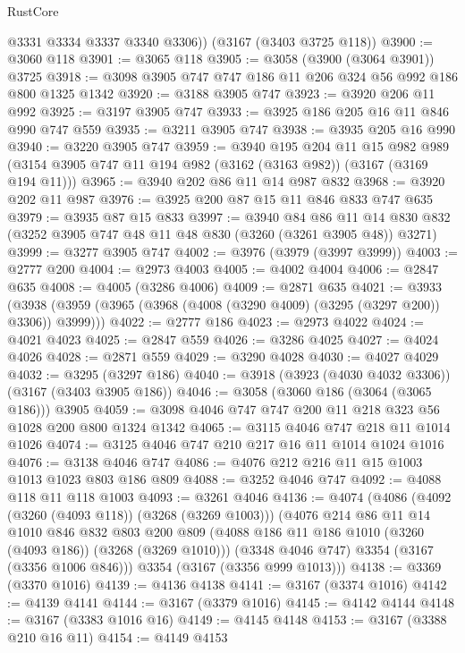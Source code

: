 \begin{lexlean}{RustCore}
\begin{coremodule}
        @3331
        @3334
        @3337
        @3340
        @3306))
    (@3167 (@3403 @3725 @118))
@3900 := @3060 @118
@3901 := @3065 @118
@3905 := @3058 (@3900 (@3064 @3901)) @3725
@3918 := @3098 @3905 @747 @747 @186 @11 @206 @324 @56 @992 @186 @800 @1325 @1342
@3920 := @3188 @3905 @747
@3923 := @3920 @206 @11 @992
@3925 := @3197 @3905 @747
@3933 := @3925 @186 @205 @16 @11 @846 @990 @747 @559
@3935 := @3211 @3905 @747
@3938 := @3935 @205 @16 @990
@3940 := @3220 @3905 @747
@3959 := @3940
    @195
    @204
    @11
    @15
    @982
    @989
    (@3154 @3905 @747 @11 @194 @982 (@3162 (@3163 @982)) (@3167 (@3169 @194 @11)))
@3965 := @3940 @202 @86 @11 @14 @987 @832
@3968 := @3920 @202 @11 @987
@3976 := @3925 @200 @87 @15 @11 @846 @833 @747 @635
@3979 := @3935 @87 @15 @833
@3997 := @3940
    @84
    @86
    @11
    @14
    @830
    @832
    (@3252 @3905 @747 @48 @11 @48 @830 (@3260 (@3261 @3905 @48)) @3271)
@3999 := @3277 @3905 @747
@4002 := @3976 (@3979 (@3997 @3999))
@4003 := @2777 @200
@4004 := @2973 @4003
@4005 := @4002 @4004
@4006 := @2847 @635
@4008 := @4005 (@3286 @4006)
@4009 := @2871 @635
@4021 := @3933
    (@3938 (@3959 (@3965 (@3968 (@4008 (@3290 @4009) (@3295 (@3297 @200)) @3306)) @3999)))
@4022 := @2777 @186
@4023 := @2973 @4022
@4024 := @4021 @4023
@4025 := @2847 @559
@4026 := @3286 @4025
@4027 := @4024 @4026
@4028 := @2871 @559
@4029 := @3290 @4028
@4030 := @4027 @4029
@4032 := @3295 (@3297 @186)
@4040 := @3918 (@3923 (@4030 @4032 @3306)) (@3167 (@3403 @3905 @186))
@4046 := @3058 (@3060 @186 (@3064 (@3065 @186))) @3905
@4059 := @3098 @4046 @747 @747 @200 @11 @218 @323 @56 @1028 @200 @800 @1324 @1342
@4065 := @3115 @4046 @747 @218 @11 @1014 @1026
@4074 := @3125 @4046 @747 @210 @217 @16 @11 @1014 @1024 @1016
@4076 := @3138 @4046 @747
@4086 := @4076 @212 @216 @11 @15 @1003 @1013 @1023 @803 @186 @809
@4088 := @3252 @4046 @747
@4092 := @4088 @118 @11 @118 @1003
@4093 := @3261 @4046
@4136 := @4074
    (@4086
      (@4092 (@3260 (@4093 @118)) (@3268 (@3269 @1003)))
      (@4076
        @214
        @86
        @11
        @14
        @1010
        @846
        @832
        @803
        @200
        @809
        (@4088 @186 @11 @186 @1010 (@3260 (@4093 @186)) (@3268 (@3269 @1010)))
        (@3348 @4046 @747)
        @3354
        (@3167 (@3356 @1006 @846)))
      @3354
      (@3167 (@3356 @999 @1013)))
@4138 := @3369 (@3370 @1016)
@4139 := @4136 @4138
@4141 := @3167 (@3374 @1016)
@4142 := @4139 @4141
@4144 := @3167 (@3379 @1016)
@4145 := @4142 @4144
@4148 := @3167 (@3383 @1016 @16)
@4149 := @4145 @4148
@4153 := @3167 (@3388 @210 @16 @11)
@4154 := @4149 @4153

\end{coremodule}
\end{lexlean}
